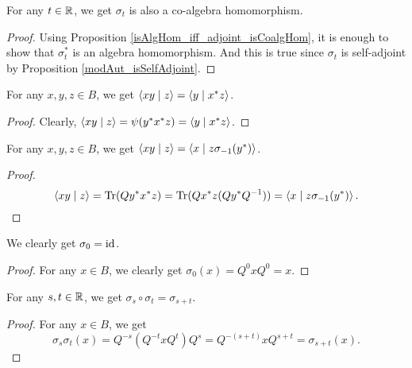  \begin{corollary}\label{modAut_isCoalgHom}
  \leanok
  For any $t\in\mathbb{R}$, we get $\sigma_t$ is also a co-algebra homomorphism.
 \end{corollary}
 \begin{proof}
  \leanok
  Using Proposition \ref{isAlgHom_iff_adjoint_isCoalgHom}, it is enough to show that $\sigma_t^*$ is an algebra homomorphism. And this is true since $\sigma_t$ is self-adjoint by Proposition \ref{modAut_isSelfAdjoint}.
 \end{proof}
 
 \begin{lemma}\label{inner_star_left}
  \leanok
  For any $x,y,z\in{B}$, we get $\left\langle xy \mid z\right\rangle=\left\langle y \mid x^*z\right\rangle$.
 \end{lemma}
 \begin{proof}\leanok
  Clearly, $\left\langle xy \mid z\right\rangle=\psi(y^*x^*z)=\left\langle y \mid x^*z\right\rangle$.
 \end{proof}

 \begin{lemma}\label{inner_conj_left}
  \leanok
  For any $x,y,z\in{B}$, we get $\left\langle xy \mid z\right\rangle=\left\langle x \mid z\sigma_{-1}(y^*)\right\rangle$.
 \end{lemma}
 \begin{proof}\leanok
  \[\left\langle xy \mid z\right\rangle=\operatorname{Tr}(Q{y^*x^*}z)=\operatorname{Tr}(Qx^*z(Qy^*Q^{-1}))=\left\langle x \mid z\sigma_{-1}(y^*)\right\rangle.\]
 \end{proof}

 \begin{lemma}\label{modAut_zero}
  \leanok
  We clearly get $\sigma_0=\operatorname{id}$.
 \end{lemma}
 \begin{proof}\leanok
  For any $x\in{B}$, we clearly get $\sigma_0(x)=Q^0xQ^0=x$.
 \end{proof}

 \begin{lemma}\label{modAut_comp}
  \leanok
  For any $s,t\in\mathbb{R}$, we get $\sigma_s\circ\sigma_t=\sigma_{s+t}$.
 \end{lemma}
 \begin{proof}\leanok
  For any $x\in{B}$, we get
  \[\sigma_s\sigma_t(x)=Q^{-s}(Q^{-t}xQ^t)Q^s=Q^{-(s+t)}xQ^{s+t}=\sigma_{s+t}(x).\]
 \end{proof}


